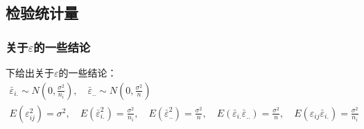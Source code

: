 \subsection{检验统计量}
\subsubsection{关于$\varepsilon$的一些结论}
下给出关于$\varepsilon$的一些结论：
\begin{gather*}
	\bar{\varepsilon}_{i.}\sim N(0,\frac{\sigma^2}{n_i}),\quad\bar{\varepsilon}_{..}\sim N(0,\frac{\sigma^2}{n}) \\
	E(\varepsilon_{ij}^2)=\sigma^2,\quad
	E(\bar{\varepsilon}_{i.}^2)=\frac{\sigma^2}{n_i},\quad
	E(\bar{\varepsilon}_{..}^2)=\frac{\sigma^2}{n},\quad
	E(\bar{\varepsilon}_{i.}\bar{\varepsilon}_{..})=\frac{\sigma^2}{n},\quad
	E(\varepsilon_{ij}\bar{\varepsilon}_{i.})=\frac{\sigma^2}{n_i}
\end{gather*}

